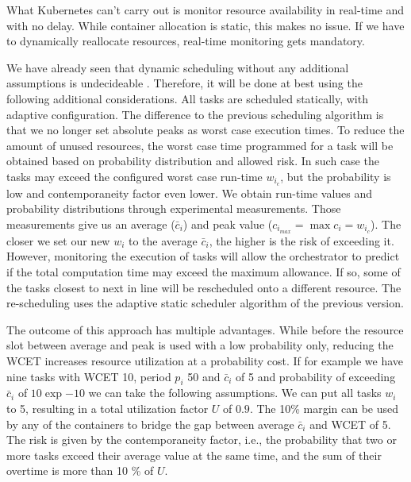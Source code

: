 \documentclass[]{scrartcl}
\begin{document}
What Kubernetes can't carry out is monitor  resource availability in real-time and with no delay.
While container allocation is static, this makes no issue. 
If we have to dynamically reallocate resources, real-time monitoring gets mandatory.

We have already seen that dynamic scheduling without any additional assumptions is undecideable . %
Therefore, it will be done at best using the following additional considerations.
All tasks are scheduled statically, with adaptive configuration.
The difference to the previous scheduling algorithm is that we no longer set absolute peaks as worst case execution times. 
To reduce the amount of unused resources, the worst case time programmed for a task will be obtained based on probability distribution and allowed risk.
In such case the tasks may exceed the configured worst case run-time $w_{i_c}$, but the probability is low and contemporaneity factor even lower. %
We obtain run-time values and probability distributions through experimental measurements. 
Those measurements give us an average ($\bar c_i$) and peak value ($c_{i_{max}} = \max c_i = w_{i_c} $). The closer we set our new $w_i$ to the average $\bar c_i$, the higher is the risk of exceeding it.
However, monitoring the execution of tasks will allow the orchestrator to predict if the total computation time may exceed the maximum allowance.
If so, some of the tasks closest to next in line will be rescheduled onto a different resource. 
The re-scheduling uses the adaptive static scheduler algorithm of the previous version.

The outcome of this approach has multiple advantages. 
While before the resource slot between average and peak is used with a low probability only, reducing the WCET increases resource utilization at a probability cost.
If for example we have nine tasks with WCET 10, period $p_i$ 50 and $\bar c_i$ of 5 and probability of exceeding $\bar c_i$ of $10\exp {-10}$ we can take the following assumptions.
We can put all tasks $w_i$ to 5, resulting in a total utilization factor $U$ of $0.9$.
The 10\% margin can be used by any of the containers to bridge the gap between average $\bar c_i$ and WCET of 5.
The risk is given by the contemporaneity factor, i.e., the probability that two or more tasks exceed their average value at the same time, and the sum of their overtime is more than 10
\% of $U$.
\end{document}
